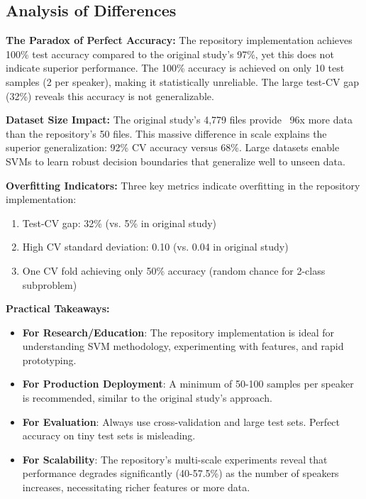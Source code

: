 \documentclass[11pt,twoside,openany]{book}
\begin{document}
\subsection{Analysis of Differences}

\textbf{The Paradox of Perfect Accuracy:} The repository implementation achieves 100\% test accuracy compared to the original study's 97\%, yet this does not indicate superior performance. The 100\% accuracy is achieved on only 10 test samples (2 per speaker), making it statistically unreliable. The large test-CV gap (32\%) reveals this accuracy is not generalizable.

\textbf{Dataset Size Impact:} The original study's 4,779 files provide ~96x more data than the repository's 50 files. This massive difference in scale explains the superior generalization: 92\% CV accuracy versus 68\%. Large datasets enable SVMs to learn robust decision boundaries that generalize well to unseen data.

\textbf{Overfitting Indicators:} Three key metrics indicate overfitting in the repository implementation:
\begin{enumerate}[itemsep=1pt]
\item Test-CV gap: 32\% (vs. 5\% in original study)
\item High CV standard deviation: 0.10 (vs. 0.04 in original study)
\item One CV fold achieving only 50\% accuracy (random chance for 2-class subproblem)
\end{enumerate}

\textbf{Practical Takeaways:}
\begin{itemize}[itemsep=1pt]
\item \textbf{For Research/Education}: The repository implementation is ideal for understanding SVM methodology, experimenting with features, and rapid prototyping.
\item \textbf{For Production Deployment}: A minimum of 50-100 samples per speaker is recommended, similar to the original study's approach.
\item \textbf{For Evaluation}: Always use cross-validation and large test sets. Perfect accuracy on tiny test sets is misleading.
\item \textbf{For Scalability}: The repository's multi-scale experiments reveal that performance degrades significantly (40-57.5\%) as the number of speakers increases, necessitating richer features or more data.
\end{itemize}
\end{document}

